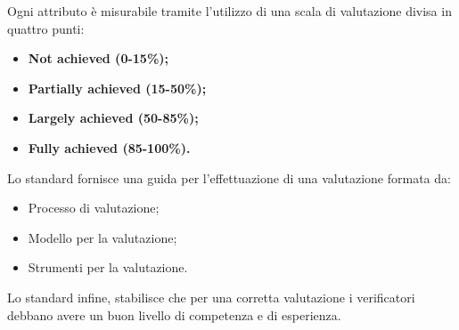 	Ogni attributo è misurabile tramite l'utilizzo di una scala di valutazione divisa in quattro punti:
		\begin{itemize}
			\item \textbf{Not achieved (0-15\%);}
			\item \textbf{Partially achieved (15-50\%);}
			\item \textbf{Largely achieved (50-85\%);}
			\item \textbf{Fully achieved (85-100\%).}
		\end{itemize}
	Lo standard fornisce una guida per l'effettuazione di una valutazione formata da:
		\begin{itemize}
			\item Processo di valutazione;
			\item Modello per la valutazione;
			\item Strumenti per la valutazione.
		\end{itemize}
	Lo standard infine, stabilisce che per una corretta valutazione i verificatori debbano avere un buon livello di competenza e di esperienza.
	
